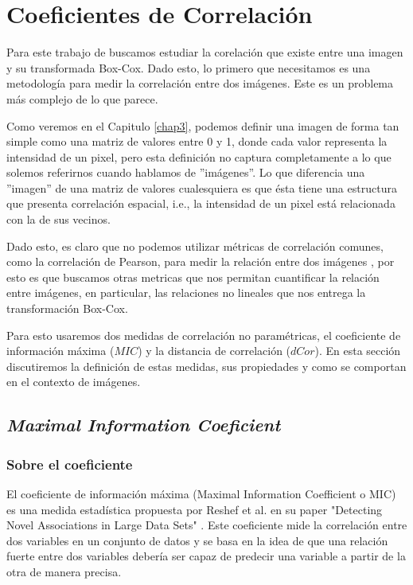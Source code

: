\chapter{Coeficientes de Correlaci\'on}\label{chap2}
        
    Para este trabajo de buscamos estudiar la corelaci\'on que existe entre una imagen y su transformada Box-Cox. Dado esto, lo primero que necesitamos es una metodolog\'ia para medir la correlaci\'on entre dos im\'agenes. Este es un problema m\'as complejo de lo que parece. 

    Como veremos en el Capitulo \ref{chap3}, podemos definir una imagen de forma tan simple como una matriz de valores entre 0 y 1, donde cada valor representa la intensidad de un pixel, pero esta definici\'on no captura completamente a lo que solemos referirnos cuando hablamos de ''im\'agenes''. Lo que diferencia una ''imagen'' de una matriz de valores cualesquiera es que \'esta tiene una estructura que presenta correlaci\'on espacial, i.e., la intensidad de un pixel est\'a relacionada con la de sus vecinos.

    Dado esto, es claro que no podemos utilizar m\'etricas de correlaci\'on comunes, como la correlaci\'on de Pearson, para medir la relaci\'on entre dos im\'agenes \cite{personbad}, por esto es que buscamos otras metricas que nos permitan cuantificar la relaci\'on entre im\'agenes, en particular, las relaciones no lineales que nos entrega la transformaci\'on Box-Cox.

    Para esto usaremos dos medidas de correlaci\'on no param\'etricas, el coeficiente de informaci\'on m\'axima ($MIC$) y la distancia de correlaci\'on ($dCor$). En esta secci\'on discutiremos la definici\'on de estas medidas, sus propiedades y como se comportan en el contexto de im\'agenes.

    \section{\textit{Maximal Information Coeficient}} 
    
    \subsection{Sobre el coeficiente}
    
        El coeficiente de informaci\'on m\'axima (Maximal Information Coefficient o MIC) es una medida estad\'istica propuesta por Reshef et al. en su paper "Detecting Novel Associations in Large Data Sets" \cite{Reshef2011}. Este coeficiente mide la correlaci\'on entre dos variables en un conjunto de datos y se basa en la idea de que una relaci\'on fuerte entre dos variables deber\'ia ser capaz de predecir una variable a partir de la otra de manera precisa.
    
